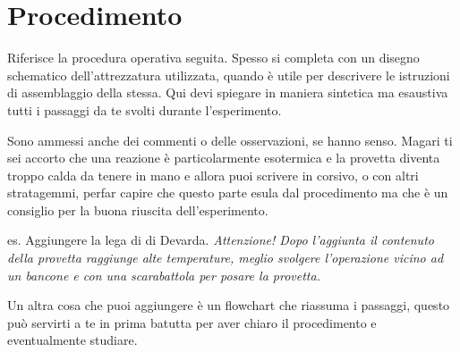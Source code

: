\section{Procedimento}
Riferisce la procedura  operativa seguita. Spesso si completa con un disegno schematico dell'attrezzatura utilizzata, quando è utile per descrivere le istruzioni di assemblaggio della stessa. Qui devi spiegare in maniera sintetica ma esaustiva tutti i passaggi da te svolti durante l'esperimento.

Sono ammessi anche dei commenti o delle osservazioni, se hanno senso. Magari ti sei accorto che una reazione è particolarmente esotermica e la provetta diventa troppo calda da tenere in mano e allora puoi scrivere in corsivo, o con altri stratagemmi, perfar capire che questo parte esula dal procedimento ma che è un consiglio per la buona riuscita dell'esperimento.

es.
Aggiungere la lega di di Devarda. 
\textit{Attenzione! Dopo l'aggiunta il contenuto della provetta raggiunge alte temperature, meglio svolgere l'operazione vicino ad un bancone e con una scarabattola per posare la provetta.}


Un altra cosa che puoi aggiungere è un flowchart che riassuma i passaggi, questo può servirti a te in prima batutta per aver chiaro il procedimento e eventualmente studiare.

